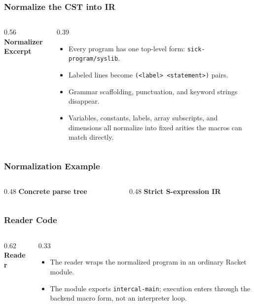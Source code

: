 \documentclass{beamer}
\begin{document}
\begin{frame}[fragile,shrink=15]
  \frametitle{Normalize the CST into IR}

  \begin{columns}[T]
    \begin{column}{0.56\textwidth}
      \textbf{Normalizer Excerpt}

      
    \end{column}
    \begin{column}{0.39\textwidth}
      \begin{itemize}
        \item Every program has one top-level form: \texttt{sick-program/syslib}.
        \item Labeled lines become \texttt{(<label> <statement>)} pairs.
        \item Grammar scaffolding, punctuation, and keyword strings disappear.
        \item Variables, constants, labels, array subscripts, and dimensions all normalize into fixed arities the macros can match directly.
      \end{itemize}
    \end{column}
  \end{columns}
\end{frame}

\begin{frame}[fragile,shrink=5]
  \frametitle{Normalization Example}

  \begin{columns}[T]
    \begin{column}{0.48\textwidth}
      \textbf{Concrete parse tree}
      
    \end{column}
    \begin{column}{0.48\textwidth}
      \textbf{Strict S-expression IR}
      
    \end{column}
  \end{columns}
\end{frame}

\begin{frame}[fragile,shrink=8]
  \frametitle{Reader Code}

  \begin{columns}[T]
    \begin{column}{0.62\textwidth}
      \textbf{Reader}
      
    \end{column}
    \begin{column}{0.33\textwidth}
      \begin{itemize}
        \item The reader wraps the normalized program in an ordinary Racket module.
        \item The module exports \texttt{intercal-main}; execution enters through the backend macro form, not an interpreter loop.
      \end{itemize}
    \end{column}
  \end{columns}
\end{frame}
\end{document}
